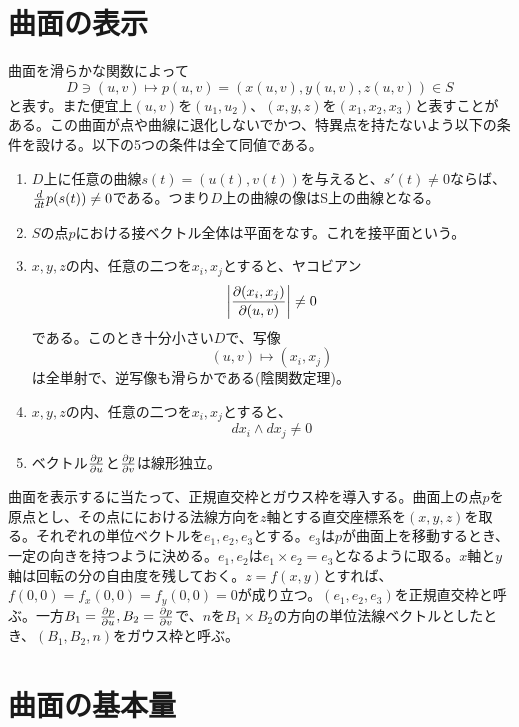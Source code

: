 
\section{曲面の表示}
    曲面を滑らかな関数によって
        \[D \ni (u,v) \mapsto p(u,v) = (x(u,v), y(u,v), z(u,v)) \in S\]
    と表す。また便宜上$(u,v)$を$(u_1,u_2)$、$(x,y,z)$を$(x_1,x_2,x_3)$と表すことがある。この曲面が点や曲線に退化しないでかつ、特異点を持たないよう以下の条件を設ける。以下の5つの条件は全て同値である。
    \begin{enumerate}
        \item $D$上に任意の曲線$s(t) = (u(t),v(t))$を与えると、$s'(t) \neq 0$ならば、$\de{t}p(s(t)) \neq 0$である。つまり$D$上の曲線の像はS上の曲線となる。
        \item $S$の点$p$における接ベクトル全体は平面をなす。これを接平面という。
        \item $x,y,z$の内、任意の二つを$x_i,x_j$とすると、ヤコビアン
                  \[\left|\pd[(x_i,x_j)]{(u,v)}\right|\neq 0\]
              である。このとき十分小さい$D$で、写像
                  \[(u,v) \mapsto (x_i,x_j)\]
              は全単射で、逆写像も滑らかである(陰関数定理)。
        \item $x,y,z$の内、任意の二つを$x_i,x_j$とすると、
                  \[dx_i \wedge dx_j \neq 0\]
        \item ベクトル$\pd[p]{u}$と$\pd[p]{v}$は線形独立。
    \end{enumerate}
    曲面を表示するに当たって、正規直交枠とガウス枠を導入する。曲面上の点$p$を原点とし、その点ににおける法線方向を$z$軸とする直交座標系を$(x,y,z)$を取る。それぞれの単位ベクトルを$e_1,e_2,e_3$とする。$e_3$は$p$が曲面上を移動するとき、一定の向きを持つように決める。$e_1,e_2$は$e_1 \times e_2 = e_3$となるように取る。$x$軸と$y$軸は回転の分の自由度を残しておく。$z = f(x,y)$とすれば、$f(0,0) = f_x(0,0) = f_y(0,0) = 0$が成り立つ。$(e_1,e_2,e_3)$を正規直交枠と呼ぶ。一方$B_1 = \pd[p]{u}, B_2 = \pd[p]{v}$で、$n$を$B_1 \times B_2$の方向の単位法線ベクトルとしたとき、$(B_1,B_2,n)$をガウス枠と呼ぶ。

\section{曲面の基本量}
